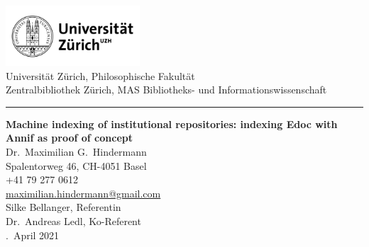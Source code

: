 \newpage
\thispagestyle{empty}
\large
\begin{center}
	\includegraphics[width=5cm]{./logo.png}\\[.5cm]
	Universität Zürich, Philosophische Fakultät\\[.25cm]
 	Zentralbibliothek Zürich, MAS Bibliotheks- und Informationswissenschaft\\[1cm]
	\hrule
	\vspace{2cm}
	\flushleft
	\textbf{\LARGE Machine indexing of institutional repositories: indexing Edoc with Annif as proof of concept}\\[2cm]
	Dr.\ Maximilian G.\ Hindermann \\
	Spalentorweg 46, CH-4051 Basel\\
	+41 79 277 0612\\
	\href{mailto:maximilian.hindermann@gmail.com}{maximilian.hindermann@gmail.com}\\
	\vspace{1cm}
	\flushleft
	Silke Bellanger, Referentin \\[.25cm]
	Dr.\ Andreas Ledl, Ko-Referent \\
	\vfill
	.\ April 2021
\end{center}
\normalfont
\normalsize